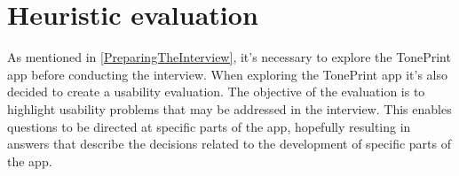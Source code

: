 
\section{Heuristic evaluation}
\label{SectionHeuristicEvaluation}
As mentioned in \autoref{PreparingTheInterview}, it's necessary to explore the TonePrint app before conducting the interview. When exploring the TonePrint app it's also decided to create a usability evaluation. The objective of the evaluation is to highlight usability problems that may be addressed in the interview. This enables questions to be directed at specific parts of the app, hopefully resulting in answers that describe the decisions related to the development of specific parts of the app.

